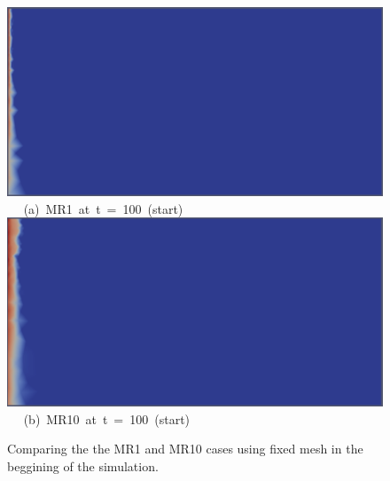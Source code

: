\begin{figure}[ht] 
\vbox{
\hbox{\hspace{1.5cm}
\includegraphics[width=.75\textwidth]{./Pics1/mr1_fixed/mr1_fixed_100_2.pdf} 
}
\vspace{0.0cm}
\hbox{\hspace{5.0cm} (a) MR1 at t = 100 (start)   
}
\vspace{0.25cm}
\hbox{\hspace{1.5cm}
\includegraphics[width=.75\textwidth]{./Pics1/mr10_fixed/mr10_fixed_100_1.pdf}
}
\vspace{0.0cm}
\hbox{\hspace{5.0cm} (b) MR10 at t = 100 (start)  
}
}     
\caption{Comparing the the MR1 and MR10 cases using fixed mesh in the beggining of the simulation.}
\label{fig:6a}
\end{figure}



